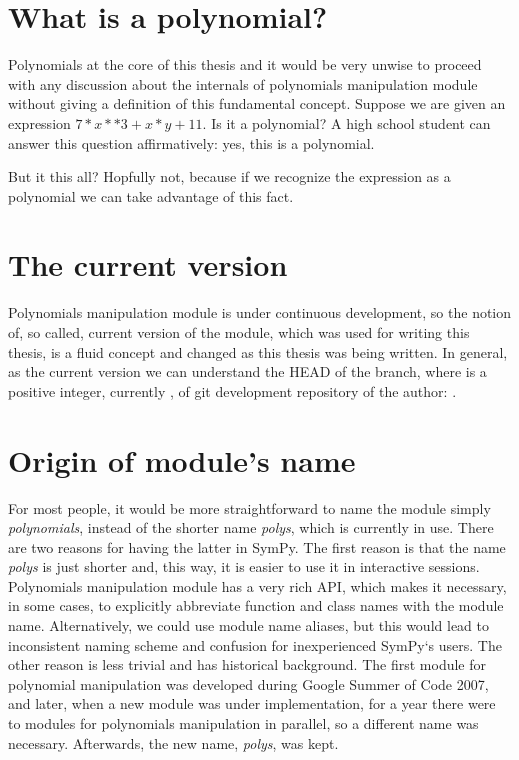 \section{What is a polynomial?}

Polynomials at the core of this thesis and it would be very unwise to proceed with any discussion about
the internals of polynomials manipulation module without giving a definition of this fundamental concept.
Suppose we are given an expression $7*x**3 + x*y + 11$. Is it a polynomial? A high school student can
answer this question affirmatively: yes, this is a polynomial.

But it this all? Hopfully not, because
if we recognize the expression as a polynomial we can take advantage of this fact.


\section{The current version}

Polynomials manipulation module is under continuous development, so the notion of, so called, current
version of the module, which was used for writing this thesis, is a fluid concept and changed as this
thesis was being written. In general, as the current version we can understand the HEAD of the 
branch, where  is a positive integer, currently , of git development repository of the
author: .


\section{Origin of module's name}

For most people, it would be more straightforward to name the module simply \emph{polynomials}, instead
of the shorter name \emph{polys}, which is currently in use. There are two reasons for having the latter
in SymPy. The first reason is that the name \emph{polys} is just shorter and, this way, it is easier to
use it in interactive sessions. Polynomials manipulation module has a very rich API, which makes it
necessary, in some cases, to explicitly abbreviate function and class names with the module name.
Alternatively, we could use module name aliases, but this would lead to inconsistent naming scheme
and confusion for inexperienced SymPy`s users. The other reason is less trivial and has historical
background. The first module for polynomial manipulation was developed during Google Summer of Code
2007, and later, when a new module was under implementation, for a year there were to modules for
polynomials manipulation in parallel, so a different name was necessary. Afterwards, the new name,
\emph{polys}, was kept.


